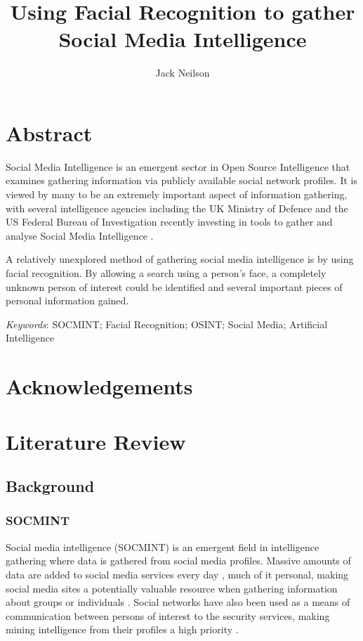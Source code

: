 \documentclass[12pt]{article}
\begin{document}
\title{Using Facial Recognition to gather Social Media Intelligence}
\author{Jack Neilson}
\maketitle
\newpage
\tableofcontents
\newpage

\section{Abstract}
Social Media Intelligence is an emergent sector in Open Source Intelligence that examines gathering information via publicly available social network profiles. It is viewed by many to be an extremely important aspect of information gathering, with several intelligence agencies including the UK Ministry of Defence and the US Federal Bureau of Investigation recently investing in tools to gather and analyse Social Media Intelligence \citep{socmintpublicsafety}.

A relatively unexplored method of gathering social media intelligence is by using facial recognition. By allowing a search using a person's face, a completely unknown person of interest could be identified and several important pieces of personal information gained.

\textit{Keywords}: SOCMINT; Facial Recognition; OSINT; Social Media; Artificial Intelligence

\section{Acknowledgements}
\newpage

\section{Literature Review}
\subsection{Background}
\subsubsection{SOCMINT}
Social media intelligence (SOCMINT) is an emergent field in intelligence gathering where data is gathered from social media profiles. Massive amounts of data are added to social media services every day \citep{socmintoverview}, much of it personal, making social media sites a potentially valuable resource when gathering information about groups or individuals \citep{gchqmasssurveillance}. Social networks have also been used as a means of communication between persons of interest to the security services, making mining intelligence from their profiles a high priority \citep{socmintoverview}\citep{policesocmint}.
\end{document}
